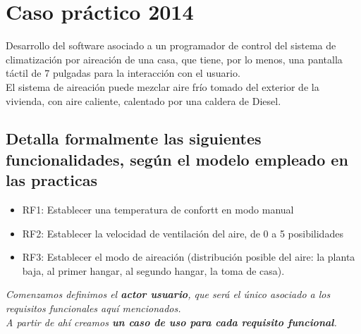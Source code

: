 \section{Caso práctico 2014}
Desarrollo del software asociado a un programador de control del sistema de climatización por aireación de una casa, que tiene, por lo menos, una pantalla táctil de 7 pulgadas para la interacción con el usuario.\\
El sistema de aireación puede mezclar aire frío tomado del exterior de la vivienda, con aire caliente, calentado por una caldera de Diesel.

\subsection{Detalla formalmente las siguientes funcionalidades, según el modelo empleado en las practicas}
\begin{itemize}
    \item RF1: Establecer una temperatura de confortt en modo manual
    \item RF2: Establecer la velocidad de ventilación del aire, de 0 a 5 posibilidades
    \item RF3: Establecer el modo de aireación (distribución posible del aire: la planta baja, al primer hangar, al segundo hangar, la toma de casa).
\end{itemize}
\textit{Comenzamos definimos el \textbf{actor usuario}, que será el único asociado a los requisitos funcionales aquí mencionados.\\
A partir de ahí creamos \textbf{un caso de uso para cada requisito funcional}.\\}


